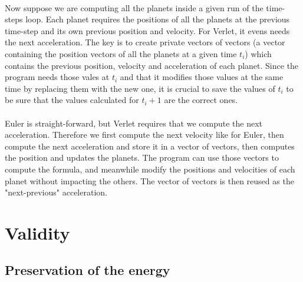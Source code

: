 \documentclass[a4paper, twoside, 11pt]{report}
\theoremstyle{theorem}
\theoremstyle{remark}
\theoremstyle{exemple}
\begin{document}
                \paragraph{}Now suppose we are computing all the planets inside a given run of the time-steps loop. Each planet requires the positions of all the planets at the previous time-step and its own previous position and velocity. For Verlet, it evens needs the next acceleration. The key is to create private vectors of vectors (a vector containing the position vectors of all the planets at a given time $t_i$) which contains the previous position, velocity and acceleration of each planet. Since the program needs those vales at $t_i$ and that it modifies those values at the same time by replacing them with the new one, it is crucial to save the values of $t_i$ to be sure that the values calculated for $t_i+1$ are the correct ones.   
                
                \paragraph{}Euler is straight-forward, but Verlet requires that we compute the next acceleration. Therefore we first compute the next velocity like for Euler, then compute the next acceleration and store it in a vector of vectors, then computes the position and updates the planets. The program can use those vectors to compute the formula, and meanwhile modify the positions and velocities of each planet without impacting the others. The vector of vectors is then reused as the "next-previous" acceleration.
        	        
        \section{Validity}
        
        	\subsection{Preservation of the energy}
	
\end{document}
